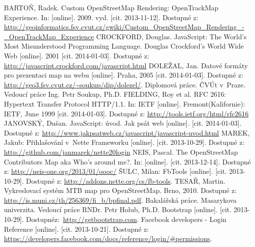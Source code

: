 \documentclass[11pt,a4paper,titlepage,oneside]{book}
\begin{document}



\newpage
{}
\begin{thebibliography}{99}
	 BARTOŇ, Radek. Custom OpenStreetMap Rendering: Open\-TrackMap Experience. In: [online]. 2009. vyd. [cit. 2013-11-12]. Dostupné z:  \url{http://geoinformatics.fsv.cvut.cz/gwiki/Custom_OpenStreetMap_Rendering_-_OpenTrackMap_Experience}
	CROCKFORD, Douglas. JavaScript: The World's Most Misunderstood Programming Language. Douglas Crockford's World Wide Web [online]. 2001 [cit. 2014-01-03]. Dostupné z: \url{http://javascript.crockford.com/javascript.html}
	DOLEŽAL, Jan. Datové formáty pro prezentaci map na webu [online]. Praha, 2005 [cit. 2014-01-03]. Dostupné z: \url{http://geo3.fsv.cvut.cz/~soukup/dip/dolezel/}. Diplomová práce. ČVÚt v~Praze. Vedoucí práce Ing. Petr Soukup, Ph.D.
	FIELDING, Roy et al. RFC 2616: Hypertext Transfer Protocol HTTP/1.1. In: IETF [online]. Fremont(Kalifornie): IETF, June 1999 [cit. 2014-01-03]. Dostupné z: \url{http://tools.ietf.org/html/rfc2616}
        JANOVSKÝ, Dušan. JavaScript: úvod. Jak psát web [online]. [cit. 2014-01-03]. Dostupné z: \url{http://www.jakpsatweb.cz/javascript/javascript-uvod.html}
	MAREK, Jakub: Přihlašování v~Nette Frameworku [online].  [cit. 2013-10-29]. Dostupné z: \url{http://github.com/janmarek/nette20login}
	NEIS, Pascal. The OpenStreetMap Contributors Map aka Who’s around me?. In: [online]. [cit. 2013-12-14]. Dostupné z: \url{http://neis-one.org/2013/01/oooc/}
	 ŠULC, Milan: FbTools [online].  [cit. 2013-10-29]. Dostupné z: \url{http://addons.nette.org/cs/fb-tools}.
          \newpage
	TESAŘ, Martin. Vykreslovací systém MTB map pro OpenStreetMap. Brno, 2010. Dostupné z: \url{http://is.muni.cz/th/256369/fi_b/bpfinal.pdf}. Bakalářská práce. Masarykova univerzita. Vedoucí práce RNDr. Petr Holub, Ph.D.
	Bootstrap [online].  [cit. 2013-10-29]. Dostupné\newline z:~\url{http://getbootstrap.com}.
	 Facebook developers - Login Reference [online]. [cit. 2013-10-21]. Dostupné z: \url{https://developers.facebook.com/docs/reference/login/#permissions}.

\end{thebibliography}
\end{document}
